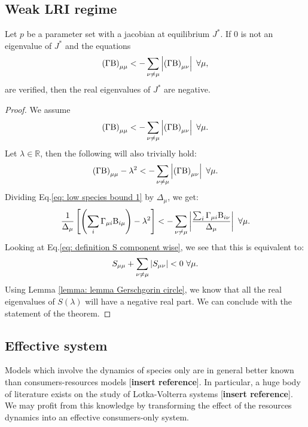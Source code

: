 \documentclass[12pt]{report}
\begin{document}
\subsection{Weak LRI regime}\label{sec : weak LRI regime}
\begin{theorem}
Let $p$ be a parameter set with a jacobian at equilibrium $J^*$. If $0$ is not an eigenvalue of $J^*$ and the equations
\begin{equation}
\left(\Gamma \text{B}\right)_{\mu\mu} < - \sum_{\nu \neq \mu } \left|{\left(\Gamma \text{B}\right)_{\mu \nu}}\right| \ \forall \mu,
\end{equation}
are verified, then the real eigenvalues of $J^*$ are negative.
\end{theorem}

\begin{proof}
We assume
\begin{equation}
\left(\Gamma \text{B}\right)_{\mu\mu} < - \sum_{\nu \neq \mu } \left|{\left(\Gamma \text{B}\right)_{\mu \nu}}\right|  \ \forall \mu.
\end{equation}
Let $\lambda \in \mathbb{R}$, then the following will also trivially hold:
\begin{equation}
  \left(\Gamma\Beta \right)_{\mu\mu} -\lambda^2 < - \sum_{\nu \neq \mu } \abs{\left(\Gamma \Beta\right)_{\mu \nu}} \ \forall \mu. \label{eq: low species bound 1}
\end{equation}
Dividing Eq.\eqref{eq: low species bound 1} by $\Delta_\mu$, we get:
\begin{equation}
\frac{1}{\Delta_\mu}\left[\left(\sum_i \Gamma_{\mu i} \Beta_{i \mu} \right)-{\lambda^2}\right] < - \sum_{\nu \neq \mu } \abs{\frac{\sum_i \Gamma_{\mu i}\Beta_{i\nu}}{\Delta_\mu}} \ \forall \mu.
\end{equation}
Looking at Eq.\eqref{eq: definition S component wise}, we see that this is equivalent to:
\begin{equation}
S_{\mu \mu} + \sum_{\nu \neq \mu} \left|{S_{\mu \nu}}\right| < 0\ \forall \mu.
\end{equation}
Using Lemma \ref{lemma: lemma Gerschgorin circle}, we know that all the real eigenvalues of $S(\lambda)$ will have a negative real part.
We can conclude with the statement of the theorem.
\end{proof}


\subsection{Effective system}
\normalfont
Models which involve the dynamics of species only are in general better known than consumers-resources models [\textbf{insert reference}]. In particular, a huge body of literature exists on the study of Lotka-Volterra systems [\textbf{insert reference}]. We may profit from this knowledge by transforming the effect of the resources dynamics into an effective consumers-only system.
\end{document}
